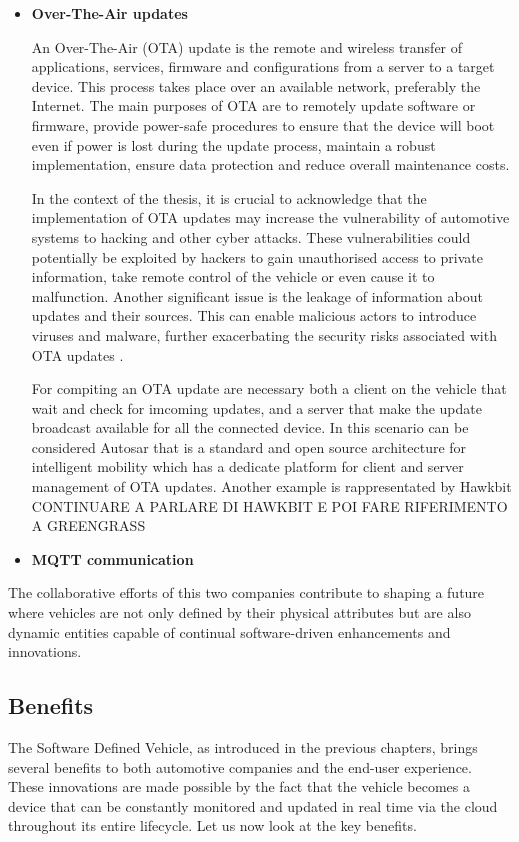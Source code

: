 \begin{itemize}
    \item \textbf{Over-The-Air updates}
    
    An Over-The-Air (OTA) update is the remote and wireless transfer of applications, services, firmware and configurations from a server to a target device. This process takes place over an available network, preferably the Internet. The main purposes of OTA are to remotely update software or firmware, provide power-safe procedures to ensure that the device will boot even if power is lost during the update process, maintain a robust implementation, ensure data protection and reduce overall maintenance costs. \cite{Open-sourceSWUpdate}

    In the context of the thesis, it is crucial to acknowledge that the implementation of OTA updates may increase the vulnerability of automotive systems to hacking and other cyber attacks. These vulnerabilities could potentially be exploited by hackers to gain unauthorised access to private information, take remote control of the vehicle or even cause it to malfunction. Another significant issue is the leakage of information about updates and their sources. This can enable malicious actors to introduce viruses and malware, further exacerbating the security risks associated with OTA updates \cite{EnhancedMulti-LevelSecureUpdate}. 
    
    For compiting an OTA update are necessary both a client on the vehicle that wait and check for imcoming updates, and a server that make the update broadcast available for all the connected device. In this scenario can be considered Autosar that is a standard and open source architecture for intelligent mobility \cite{AutosarAbout} which has a dedicate platform for client and server management of OTA updates. Another example is rappresentated by Hawkbit CONTINUARE A PARLARE DI HAWKBIT E POI FARE RIFERIMENTO A GREENGRASS 
    \item \textbf{MQTT communication}
\end{itemize}


The collaborative efforts of this two companies contribute to shaping a future where vehicles are not only defined by their physical attributes but are also dynamic entities capable of continual software-driven enhancements and innovations.

\subsection{Benefits}
The Software Defined Vehicle, as introduced in the previous chapters, brings several benefits to both automotive companies and the end-user experience.  These innovations are made possible by the fact that the vehicle becomes a device that can be constantly monitored and updated in real time via the cloud throughout its entire lifecycle. Let us now look at the key benefits.

